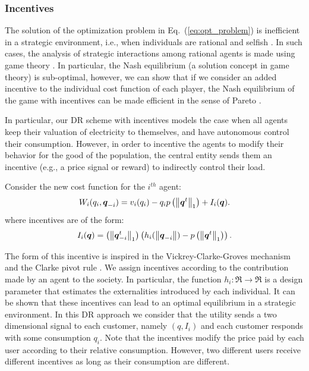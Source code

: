 \subsubsection{Incentives}

The solution of the optimization problem in Eq.~(\ref{eq:opt_problem}) is inefficient in a strategic environment, i.e., when individuals are rational and selfish \cite{barreto2013design, Johari09}. In such cases, the analysis of strategic interactions among rational agents is made using game theory \cite{fudenberg98}.
In particular, the Nash equilibrium (a solution concept in game theory)  is sub-optimal, however, we can show that if we consider an added incentive to the individual cost function of each player, the Nash equilibrium of the game with incentives can be made efficient in the sense of Pareto \cite{barreto2013design, barreto2014incentives}. 

In particular, our DR scheme with incentives models the case when all agents keep their valuation of electricity to themselves, and have autonomous control their consumption. However, in order to incentive the agents to modify their behavior for the good of the population, the central entity sends them an incentive (e.g., a price signal or reward) to indirectly control their load.

Consider the new cost function for the $i^{th}$ agent:
\begin{equation}\label{eq:game2}
W_i(q_i,\boldsymbol{q}_{-i}) 
= v_i(q_i) -  q_i p\left( \left\lVert\boldsymbol{q}^t\right\rVert_1 \right) + I_i(\boldsymbol{q}) .
\end{equation}
where incentives are of the form:
\begin{equation}\label{eq:I_i}
I_i(\boldsymbol{q}) = \left( \left\lVert\boldsymbol{q}_{-i}^t\right\rVert_1\right) \left( h_i(\left\lVert\boldsymbol{q}_{-i}\right\rVert)  - p\left( \left\lVert\boldsymbol{q}^t\right\rVert_1 \right) \right).
\end{equation}


The form of this incentive is inspired in the 
Vickrey-Clarke-Groves mechanism and the  Clarke pivot rule \cite{AlgorithmicG}.
%
We assign incentives according to the contribution made by an agent 
to the society. In particular, the function $h_i:\Re \to \Re$ is a design parameter that estimates the externalities introduced by each individual.
It can be shown that these incentives can lead to an optimal equilibrium in a strategic environment.
In this DR approach we consider that the utility sends a two dimensional signal to each customer, namely $(q,I_i)$ and each customer responds with some consumption $q_i$. 
Note that the incentives modify the price paid by each user according to their relative consumption. However, two different users receive different incentives as long as their consumption are different.





